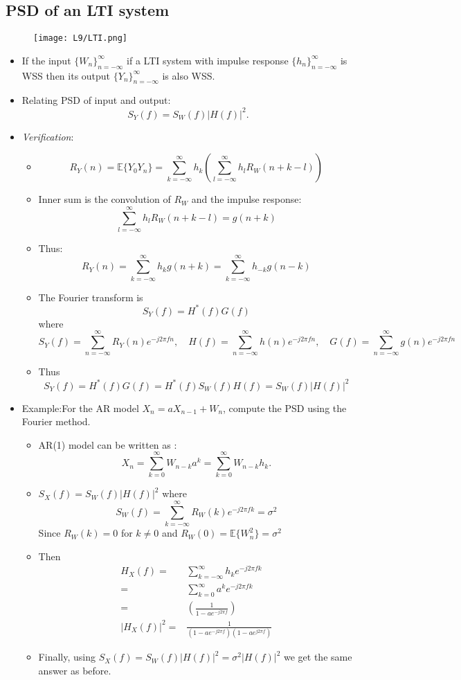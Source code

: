 \documentclass[12pt]{article}
\newcommand{\sigd}{\sigma^2}
\newcommand{\mexpproc}[1]{\mathbb{E}\{ #1\}}
\newcommand{\summ}[2]{\sum_{#1}^{#2}}
\newcommand{\sumkzeroinf}{\summ{k=0}{\infty}}
\newcommand{\sumkinfinf}{\summ{k=-\infty}{\infty}}
\newcommand{\sumninfinf}{\summ{n=-\infty}{\infty}}
\newcommand{\arproc}[1]{$\{#1_n \}_{n=-\infty}^{\infty}$}
\newcommand{\psdval}[1]{S_{#1}(f)}
\newcommand{\focoef}[1]{e^{-j2\pi f #1}}
\newcommand{\focoefinv}[1]{e^{j2\pi f #1}}
\begin{document}
\subsection{PSD of an LTI system}
\begin{figure}[H]
    \centering
    \texttt{[image: L9/LTI.png]}
\end{figure}
\begin{itemize}
    \item If the input \arproc{W} if a LTI system with impulse response \arproc{h} is WSS then its output \arproc{Y} is also WSS.
    \item Relating PSD of input and output:
    \[
    \psdval{Y} = \psdval{W}|H(f)|^2.
    \]
    \item \textit{Verification}:
    \begin{itemize}
        \item
    \[
    R_Y(n) = \mexpproc{Y_0Y_n} = \sumkinfinf h_k \left(\summ{l=-\infty}{\infty}h_l R_W(n+k-l)\right)
    \]
    \item Inner sum is the convolution of $R_W$ and the impulse response:
    \[
    \summ{l=-\infty}{\infty}h_l R_W(n+k-l) = g(n+k)
    \]
    
    \item Thus:
    \[
    R_Y(n) = \sumkinfinf h_kg(n+k) = \sumkinfinf h_{-k}g(n-k)
    \]
    \item The Fourier transform is 
    \[
    \psdval{Y} = H^*(f)G(f)
    \]
    where 
    \[
    \psdval{Y} = \sumninfinf R_Y(n)\focoef{n}, \quad H(f) = \sumninfinf h(n)\focoef{n}, \quad G(f) = \sumninfinf g(n)\focoef{n}
    \]
    \item Thus 
    \[
    \psdval{Y} = H^*(f)G(f) = H^*(f) S_W(f)H(f) = S_W(f)|H(f)|^2
    \]
    \end{itemize}
    \item Example:For the AR model $X_n = a X_{n-1}+W_n$, compute the PSD using the Fourier method.
    \begin{itemize}
        \item AR(1) model can be written as :
        \[
        X_n = \sumkzeroinf W_{n-k} a^k = \sumkzeroinf W_{n-k} h_k .
        \]
        \item  $S_X(f) = S_W(f)|H(f)|^2$ where 
        \[
        S_W(f) = \sumkinfinf R_W(k)\focoef{k}  = \sigd
        \]
        Since $R_W(k) = 0$ for $k\not = 0 $ and $R_W(0)=\mexpproc{W_n^2} =\sigd$
        \item Then
        \begin{align*}
            H_X(f) = & \sumkinfinf h_k \focoef{k} \\
             = & \sumkzeroinf a^k \focoef{k} \\
             = & \left( \frac{1}{1 - a\focoef{}} \right) \\
            |H_X(f)|^2 = & \frac{1}{(1-a\focoef{})(1-a\focoefinv{})} 
        \end{align*}
        \item Finally, using $S_X(f) = S_W(f)|H(f)|^2 = \sigd |H(f)|^2$ we get the same answer as before.

    \end{itemize}
\end{itemize}
\end{document}
